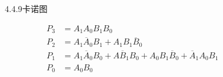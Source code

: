\documentclass[a4paper,11pt,UTF8]{article}
\begin{document}
\begin{figure}[H]
	\centering
	\setcounter{subfigure}{0}
	\caption{4.4.9卡诺图}
\end{figure}
$$\begin{aligned}
	P_3&=A_1A_0B_1B_0\\
	P_2&=A_1\overline{A}_0B_1+A_1B_1\overline{B}_0\\
	P_1&=A_1\overline{A}_0B_0+A\overline{B}_1B_0+A_0B_1\overline{B}_0+\overline{A}_1A_0B_1\\
	P_0&=A_0B_0
\end{aligned}
$$
\end{document}
